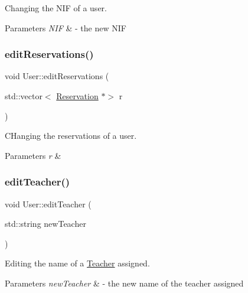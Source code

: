 Changing the N\+IF of a user. 


\begin{DoxyParams}{Parameters}
{\em N\+IF} & -\/ the new N\+IF \\
\hline
\end{DoxyParams}
\mbox{\label{class_user_a0f8f72211ae7a56e413ad70358f96a19}} 
\subsubsection{\texorpdfstring{edit\+Reservations()}{editReservations()}}
{\footnotesize\ttfamily void User\+::edit\+Reservations (\begin{DoxyParamCaption}\item[{std\+::vector$<$ \mbox{\hyperlink{class_reservation}{Reservation}} $\ast$$>$}]{r }\end{DoxyParamCaption})}



C\+Hanging the reservations of a user. 


\begin{DoxyParams}{Parameters}
{\em r} & \\
\hline
\end{DoxyParams}
\mbox{\label{class_user_a3161559f3e7b4c29b8a60a51f3d002ad}} 
\subsubsection{\texorpdfstring{edit\+Teacher()}{editTeacher()}}
{\footnotesize\ttfamily void User\+::edit\+Teacher (\begin{DoxyParamCaption}\item[{std\+::string}]{new\+Teacher }\end{DoxyParamCaption})}



Editing the name of a \mbox{\hyperlink{class_teacher}{Teacher}} assigned. 


\begin{DoxyParams}{Parameters}
{\em new\+Teacher} & -\/ the new name of the teacher assigned \\
\hline
\end{DoxyParams}
\mbox{\label{class_user_aef1759300db1bca3c84af6af79f00365}} 
